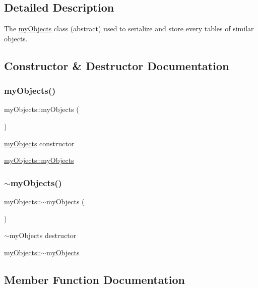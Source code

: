 \subsection{Detailed Description}
The \hyperlink{classmyObjects}{my\+Objects} class (abstract) used to serialize and store every tables of similar objects. 

\subsection{Constructor \& Destructor Documentation}
\mbox{\label{classmyObjects_a6b9ac7cbe04d4c976266ae903ed21aa0}} 
\subsubsection{\texorpdfstring{my\+Objects()}{myObjects()}}
{\footnotesize\ttfamily my\+Objects\+::my\+Objects (\begin{DoxyParamCaption}{ }\end{DoxyParamCaption})}



\hyperlink{classmyObjects}{my\+Objects} constructor 

\hyperlink{classmyObjects_a6b9ac7cbe04d4c976266ae903ed21aa0}{my\+Objects\+::my\+Objects} \mbox{\label{classmyObjects_a5695c2f6428b5b0e9633024d90b84102}} 
\subsubsection{\texorpdfstring{$\sim$my\+Objects()}{~myObjects()}}
{\footnotesize\ttfamily my\+Objects\+::$\sim$my\+Objects (\begin{DoxyParamCaption}{ }\end{DoxyParamCaption})\hspace{0.3cm}{\ttfamily [virtual]}}



$\sim$my\+Objects destructor 

\hyperlink{classmyObjects_a5695c2f6428b5b0e9633024d90b84102}{my\+Objects\+::$\sim$my\+Objects} 

\subsection{Member Function Documentation}
\mbox{\label{classmyObjects_ad4388027a338e2d15f55b87499cdca42}} 
